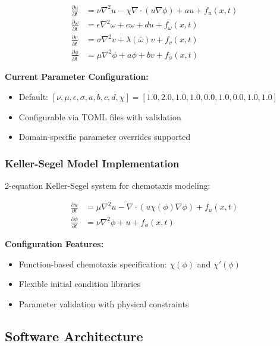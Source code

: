 \begin{align}
\frac{\partial u}{\partial t} &= \nu \nabla^2 u - \chi \nabla \cdot (u \nabla \phi) + a u + f_u(x,t) \\
\frac{\partial \omega}{\partial t} &= \epsilon \nabla^2 \omega + c \omega + d u + f_\omega(x,t) \\
\frac{\partial v}{\partial t} &= \sigma \nabla^2 v + \lambda(\bar{\omega}) v + f_v(x,t) \\
\frac{\partial \phi}{\partial t} &= \mu \nabla^2 \phi + a \phi + b v + f_\phi(x,t)
\end{align}

\textbf{Current Parameter Configuration:}
\begin{itemize}
    \item Default: $[\nu, \mu, \epsilon, \sigma, a, b, c, d, \chi] = [1.0, 2.0, 1.0, 1.0, 0.0, 1.0, 0.0, 1.0, 1.0]$
    \item Configurable via TOML files with validation
    \item Domain-specific parameter overrides supported
\end{itemize}

\subsubsection{Keller-Segel Model Implementation}

2-equation Keller-Segel system for chemotaxis modeling:

\begin{align}
\frac{\partial u}{\partial t} &= \mu \nabla^2 u - \nabla \cdot (u \chi(\phi) \nabla \phi) + f_u(x,t) \\
\frac{\partial \phi}{\partial t} &= \nu \nabla^2 \phi + u + f_\phi(x,t)
\end{align}

\textbf{Configuration Features:}
\begin{itemize}
    \item Function-based chemotaxis specification: $\chi(\phi)$ and $\chi'(\phi)$
    \item Flexible initial condition libraries
    \item Parameter validation with physical constraints
\end{itemize}

\subsection{Software Architecture}

